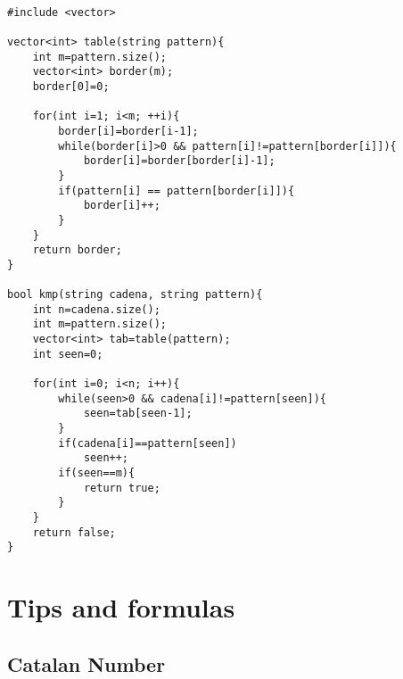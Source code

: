 \documentclass[11pt,letterpaper,twocolumn,twosided]{article}
\begin{document}
\begin{lstlisting}

#include <vector>

vector<int> table(string pattern){
	int m=pattern.size();
	vector<int> border(m);
	border[0]=0;

	for(int i=1; i<m; ++i){
		border[i]=border[i-1];
		while(border[i]>0 && pattern[i]!=pattern[border[i]]){
			border[i]=border[border[i]-1];
		}
		if(pattern[i] == pattern[border[i]]){
			border[i]++;
		}
	}
	return border;
}

bool kmp(string cadena, string pattern){
	int n=cadena.size();
	int m=pattern.size();
	vector<int> tab=table(pattern);
	int seen=0;

	for(int i=0; i<n; i++){
		while(seen>0 && cadena[i]!=pattern[seen]){
			seen=tab[seen-1];
		}
		if(cadena[i]==pattern[seen])
			seen++;
		if(seen==m){
			return true;
		}
	}
	return false;
}
\end{lstlisting}

\section{Tips and formulas}

\subsection{Catalan Number}
\end{document}
